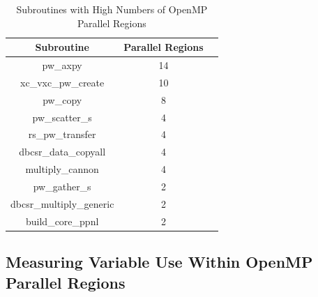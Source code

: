 \begin{table}[htbp]
\caption{Subroutines with High Numbers of OpenMP Parallel Regions}
\begin{center}
\begin{tabular}{|c|c|c|}
\hline
\textbf{Subroutine} & \textbf{Parallel Regions} \\
\hline
pw\_axpy & 14 \\
\hline
xc\_vxc\_pw\_create & 10 \\
\hline
pw\_copy & 8 \\
\hline
pw\_scatter\_s & 4 \\
\hline
rs\_pw\_transfer & 4 \\
\hline
dbcsr\_data\_copyall & 4 \\
\hline
multiply\_cannon & 4 \\
\hline
pw\_gather\_s & 2 \\
\hline
dbcsr\_multiply\_generic & 2 \\
\hline
build\_core\_ppnl & 2 \\
\hline
\end{tabular}
\label{tbl:parallel-regions}
\end{center}
\end{table}

\subsection{Measuring Variable Use Within OpenMP Parallel Regions}

